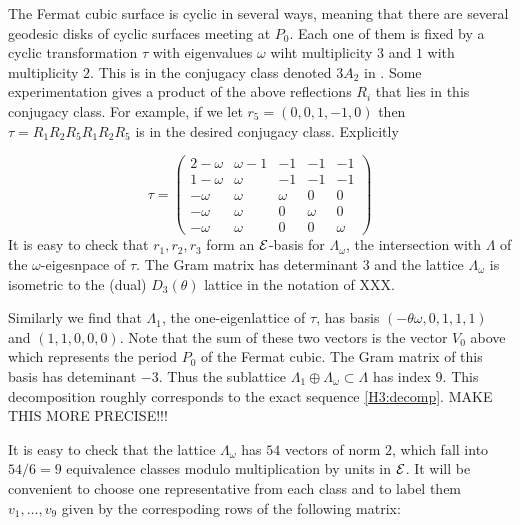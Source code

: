  The Fermat cubic surface is cyclic in several ways, meaning that there are several
geodesic disks of cyclic surfaces meeting at $P_0$. Each one of them is fixed by a
cyclic transformation $\tau$ with eigenvalues $\omega$ wiht multiplicity $3$ and $1$
with multiplicity $2$. This is in the conjugacy class denoted $3 A_2$ in
\cite{Dolgachev, Hosoh}. Some experimentation gives a product of the above reflections
$R_i$ that lies in this conjugacy class. For example, if we let $r_5 = (0,0,1,-1,0)$
then $\tau = R_1R_2R_5R_1R_2R_5$ is in the desired conjugacy class. Explicitly



\begin{equation} \label{eq-tau} \tau = \left(\begin{array}{ccccc} 2 - \omega & \omega -
1 & -1 & -1 & -1 \\1 -\omega & \omega & -1 & -1 & -1 \\ -\omega & \omega & \omega & 0 &
0 \\ -\omega & \omega & 0 & \omega & 0 \\ -\omega & \omega & 0 & 0 & \omega
\end{array}\right) \end{equation} It is easy to check that $r_1, r_2, r_3$ form an
${ \mathcal E }$-basis for $\Lambda_\omega$, the intersection with $\Lambda$ of the
$\omega$-eigesnpace of $\tau$. The Gram matrix has determinant $3$ and the lattice
$\Lambda_\omega$ is isometric to the (dual) $D_3(\theta)$ lattice in the notation of
XXX. 



Similarly we find that $\Lambda_1$, the one-eigenlattice of $\tau$, has basis
$(-\theta\omega,0,1,1,1)$ and $(1,1,0,0,0)$. Note that the sum of these two vectors is
the vector $V_0$ above which represents the period $P_0$ of the Fermat cubic. The Gram
matrix of this basis has deteminant $-3$. Thus the sublattice
$\Lambda_1\oplus\Lambda_\omega\subset\Lambda$ has index $9$.  This
decomposition roughly corresponds to the exact sequence \ref{H3:decomp}. MAKE THIS MORE
PRECISE!!!



It is easy to check that the lattice $\Lambda_\omega$ has $54$ vectors of norm $2$,
which fall into $54/6 = 9$ equivalence classes modulo multiplication by units in
${ \mathcal E }$. It will be convenient to choose one representative from each class and to label
them $v_1,\dots ,v_9$ given by the correspoding rows of the following matrix:


